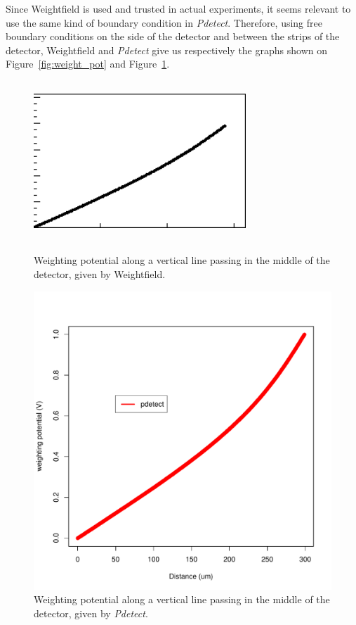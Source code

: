 \documentclass[11pt]{article}
\begin{document}
			Since Weightfield is used and trusted in actual experiments, it seems relevant to use the same kind
			of boundary condition in \textit{Pdetect}. Therefore, using free boundary conditions on the side of
			the detector and between the strips of the detector, Weightfield and \textit{Pdetect} give us respectively
			the graphs shown on Figure~\ref{fig:weight_pot} and Figure~\ref{fig:free_conditions}.

			\begin{figure}[H]
				\begin{minipage}[b]{.46\linewidth}
					\center
					\includegraphics[height=6cm, width=8cm]{images/boundary_conditions/weight_pot.png}
					\caption{Weighting potential along a vertical line passing in the middle of the detector,
							given by Weightfield.}
					\label{fig:weight_pot}
				\end{minipage} \hfill
				\begin{minipage}[b]{.46\linewidth}
				\center
					\includegraphics[scale=0.4]{images/boundary_conditions/free.pdf}
					\caption{Weighting potential along a vertical line passing in the middle of the detector,
							given by \textit{Pdetect}.}
					\label{fig:free_conditions}
					\end{minipage}
			\end{figure}
\end{document}

